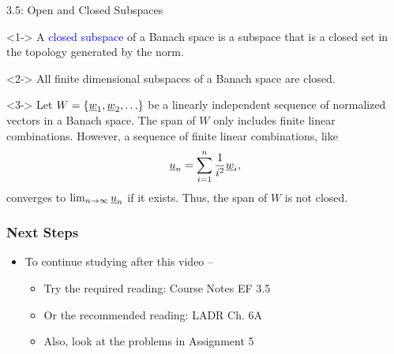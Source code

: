 \documentclass[10pt,english,aspectratio=169]{beamer}
\begin{document}
\begin{frame}{3.5: Open and Closed Subspaces}

\begin{definition}<1->
A \textcolor{blue}{closed subspace} of a Banach space is a subspace that is a closed set in the topology generated by the norm.
\end{definition}
\vspace{-0.5mm}

\begin{theorem}<2->
All finite dimensional subspaces of a Banach space are closed.
\end{theorem}
\vspace{-0.5mm}

\begin{example}<3->
Let $W = \{\underline{w}_1 ,\underline{w}_2 , \ldots \}$ be a linearly independent sequence of normalized vectors in a Banach space.
The span of $W$ only includes finite linear combinations.
However, a sequence of finite linear combinations, like \vspace{-2mm}
\[ \vecnot{u}_n = \sum_{i=1}^n \frac{1}{i^2} \vecnot{w}_i , \vspace{-1.5mm}\]  converges to $\lim_{n\to \infty} \underline{u}_n$ if it exists.
Thus, the span of $W$ is not closed.
\end{example}
\vspace{-0.5mm}


\end{frame}

\begin{frame} \frametitle{Next Steps}

\begin{itemize}
\setlength\itemsep{5mm}
\item To continue studying after this video -- \vspace{2mm}

\begin{itemize}
 \setlength\itemsep{3mm}
 \item Try the required reading: Course Notes EF 3.5
 \item Or the recommended reading: LADR Ch. 6A
 \item Also, look at the problems in Assignment 5
\end{itemize}
\end{itemize}


\end{frame}
\end{document}
